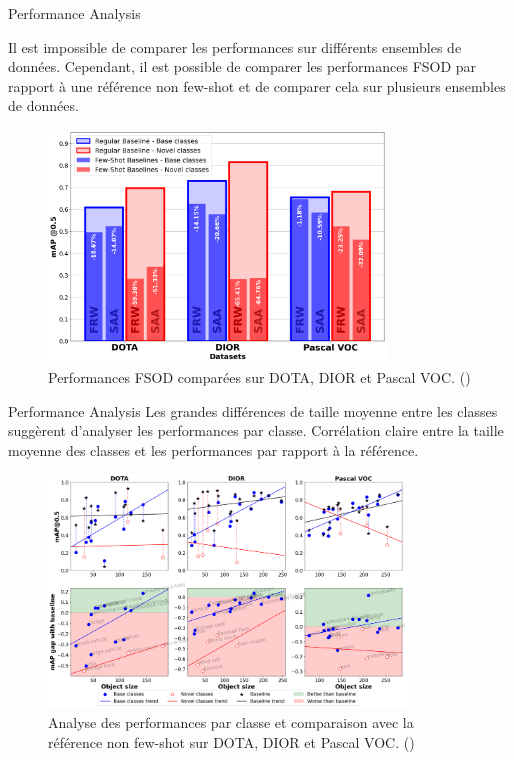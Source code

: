 \begin{subsectionframemod}{Performance Analysis}
    
    
    Il est impossible de comparer les performances sur différents ensembles de données.
    Cependant, il est possible de \alert{comparer les performances FSOD par rapport à une référence non few-shot}
    et de comparer cela sur plusieurs ensembles de données.

    \begin{figure}
        \includegraphics[width=0.8\textwidth]{Figures/dataset_comparison.png}
        \caption{Performances FSOD comparées sur DOTA, DIOR et Pascal VOC. (\cite{lejeune2022improving})}
    \end{figure}

\end{subsectionframemod}

\begin{subsectionframemod}{Performance Analysis}
    Les grandes différences de taille moyenne entre les classes suggèrent d'analyser les performances par classe.
    \alert{Corrélation claire entre la taille moyenne des classes et les performances} par rapport à la référence.
    \begin{figure}
        \includegraphics[width=0.85\textwidth]{Figures/performance_comparison.png}
    \caption{Analyse des performances par classe et comparaison avec la référence non few-shot sur DOTA, DIOR et Pascal VOC. (\cite{lejeune2022improving})}
    \end{figure}

\end{subsectionframemod}